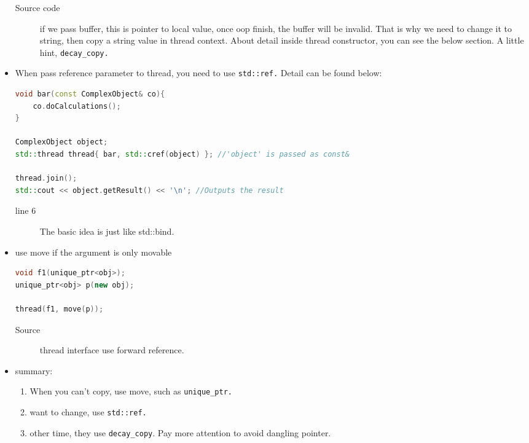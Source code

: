 \documentclass[a4paper,11pt,twoside]{book}
\begin{document}
\begin{itemize}
\begin{description}
		\item[Source code] if we pass buffer, this is pointer to local value, once oop finish, the buffer will be invalid. That is why we need to change it to string, then copy a string value in thread context. About detail inside thread constructor, you can see the below section. A little hint, \texttt{decay\_copy.}
\end{description}


	\item When pass reference parameter to thread, you need to use \texttt{std::ref.} Detail can be found below:
\begin{lstlisting}[frame=single, language=c++]
void bar(const ComplexObject& co){
	co.doCalculations();
}

ComplexObject object;
std::thread thread{ bar, std::cref(object) }; //'object' is passed as const&

thread.join();
std::cout << object.getResult() << '\n'; //Outputs the result
\end{lstlisting}

\begin{description}
	\item[line 6] The basic idea is just like std::bind. 
\end{description}

\item use move if the argument is only movable
\begin{lstlisting}[frame=single, language=c++]
void f1(unique_ptr<obj>);
unique_ptr<obj> p(new obj);

thread(f1, move(p));
\end{lstlisting}
\begin{description}
	\item[Source] thread interface use forward reference. 
\end{description}
\item summary:
\begin{enumerate}
		\item When you can't copy, use move, such as \texttt{unique\_ptr.}
		\item want to change, use \texttt{std::ref.}
		\item other time, they use \texttt{decay\_copy}. Pay more attention to avoid dangling pointer.  
\end{enumerate}

\end{itemize}
	
\end{document}
